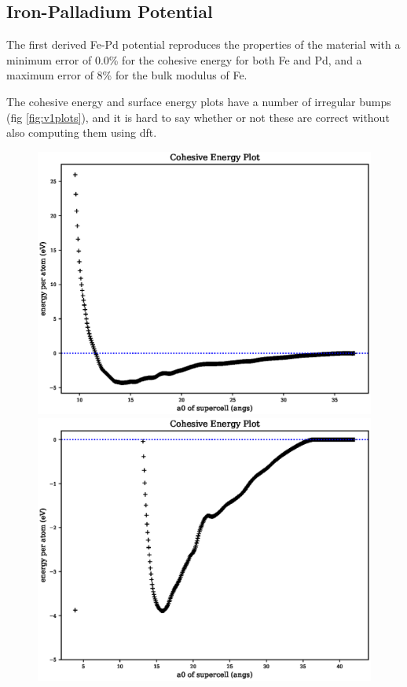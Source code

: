 \subsection{Iron-Palladium Potential}

The first derived Fe-Pd potential reproduces the properties of the material with a minimum error of 0.0\% for the cohesive energy for both Fe and Pd, and a maximum error of 8\% for the bulk modulus of Fe.

The cohesive energy and surface energy plots have a number of irregular bumps (fig \ref{fig:v1plots}), and it is hard to say whether or not these are correct without also computing them using \acrshort{dft}.

\begin{figure}[ht] 
  \centering
  \begin{minipage}[b]{0.4\linewidth}
    \centering
    \includegraphics[width=.98\linewidth]{chapters/potentials_fe_pd_ru/pot_fepd_fcc_1/fe_cohesive_energy.eps} 
  \end{minipage}%
  \begin{minipage}[b]{0.4\linewidth}
    \centering
    \includegraphics[width=.98\linewidth]{chapters/potentials_fe_pd_ru/pot_fepd_fcc_1/pd_cohesive_energy_zoom.eps} 
  \end{minipage}%


\end{figure}
